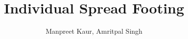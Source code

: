 \title{Individual Spread Footing}
\author{Manpreet Kaur, Amritpal Singh}
\begin{titlepage}
     \maketitle
    \tableofcontents
    \listoffigures
    \listofcharts
    \listoftables
\end{titlepage}
